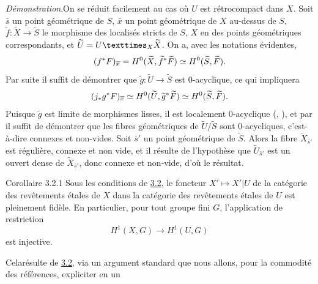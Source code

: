 \documentclass[10pt]{../fichiers-configuration-latex/smfart}
\begin{document}
\noindent
\emph{Démonstration}.\pageoriginale On se réduit facilement au cas où $U$ est
rétrocompact dans $X$. Soit $\bar{s}$ un point géométrique de $S$,
$\bar{x}$ un point géométrique de $X$ au-dessus de $S$,
$\widetilde{f}:\widetilde{X}\rightarrow \widetilde{S}$ le morphisme
des localisés stricts de $S$, $X$ en des points géométriques
correspondants, et $\widetilde{U}=\fprod{U}{\widetilde{X}}{X}$. On a,
avec les notations évidentes,
$$
(f^{\ast}F)_{\overline{x}}=H^{0}(\widetilde{X},\widetilde{f}^{\ast}\widetilde{F})\simeq
H^{0}(\widetilde{S},\widetilde{F}){}.
$$
Par suite il suffit de démontrer que
$\widetilde{g}:\widetilde{U}\rightarrow \widetilde{S}$ est
$0$-acyclique, ce qui impliquera
$$
(j_{\ast}g^{\ast}F)_{\overline{x}}\simeq
H^{0}(\widetilde{U},\widetilde{g}^{\ast}\widetilde{F})\simeq
H^{0}(\widetilde{S},\widetilde{F}){}.
$$
Puisque $\widetilde{g}$ est limite de morphismes lisses, il est
localement $0$-acyclique (, ), 
et par  il suffit de
démontrer que les fibres géométriques de $\widetilde{U}/\widetilde{S}$
sont $0$-acycliques, c'est-à-dire connexes et non-vides. Soit
$\bar{s}'$ un point géométrique de $\widetilde{S}$. Alors la fibre
$\widetilde{X}_{\bar{s}'}$ est régulière, connexe et non vide, et il
résulte de l'hypothèse que $\widetilde{U}_{\bar{s}'}$ est un ouvert
dense de $\widetilde{X}_{\bar{s}'}$, donc connexe et non-vide, d'où le
résultat.

\begin{enonce*}{Corollaire 3.2.1}
Sous les conditions de \hyperref[XVI.prop3.2]{3.2}, le foncteur $X'\mapsto X'|U$ de la
catégorie des revêtements étales de $X$ dans la catégorie des
revêtements étales de $U$ est pleinement fidèle. En particulier, pour
tout groupe fini $G$, l'application de restriction
$$
H^{1}(X,G)\longrightarrow H^{1}(U,G)
$$
est injective. 
\end{enonce*}
  
Cela\pageoriginale résulte de \hyperref[XVI.prop3.2]{3.2}, via un argument standard que nous
allons, pour la commodité des références, expliciter en un 
\end{document}
